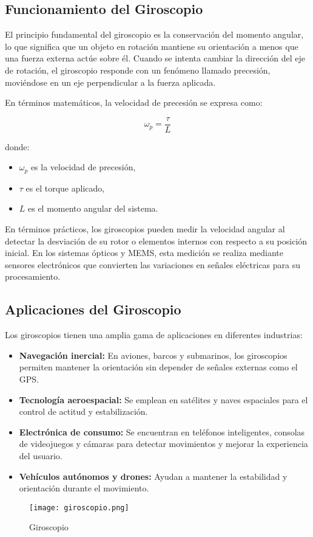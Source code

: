 \subsection{\textbf{Funcionamiento del Giroscopio}}
El principio fundamental del giroscopio es la conservación del momento angular, lo que significa que un objeto en rotación mantiene su orientación a menos que una fuerza externa actúe sobre él. Cuando se intenta cambiar la dirección del eje de rotación, el giroscopio responde con un fenómeno llamado precesión, moviéndose en un eje perpendicular a la fuerza aplicada.

En términos matemáticos, la velocidad de precesión se expresa como:

\begin{equation}
	\omega_p = \frac{\tau}{L}
\end{equation}

donde:
\begin{itemize}
	\item $\omega_p$ es la velocidad de precesión,
	\item $\tau$ es el torque aplicado,
	\item $L$ es el momento angular del sistema.
\end{itemize}

En términos prácticos, los giroscopios pueden medir la velocidad angular al detectar la desviación de su rotor o elementos internos con respecto a su posición inicial. En los sistemas ópticos y MEMS, esta medición se realiza mediante sensores electrónicos que convierten las variaciones en señales eléctricas para su procesamiento.

\subsection{\textbf{Aplicaciones del Giroscopio}}
Los giroscopios tienen una amplia gama de aplicaciones en diferentes industrias:

\begin{itemize}
	\item \textbf{Navegación inercial:} En aviones, barcos y submarinos, los giroscopios permiten mantener la orientación sin depender de señales externas como el GPS.
	\item \textbf{Tecnología aeroespacial:} Se emplean en satélites y naves espaciales para el control de actitud y estabilización.
	\item \textbf{Electrónica de consumo:} Se encuentran en teléfonos inteligentes, consolas de videojuegos y cámaras para detectar movimientos y mejorar la experiencia del usuario.
	\item \textbf{Vehículos autónomos y drones:} Ayudan a mantener la estabilidad y orientación durante el movimiento.
\end{itemize}
\begin{figure}[H]
	\centering
	\texttt{[image: giroscopio.png]}
	\caption{Giroscopio}
\end{figure}